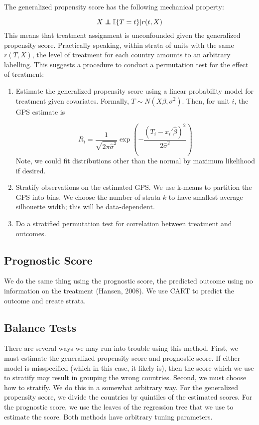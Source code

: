 \documentclass[11pt]{article}\usepackage[]{graphicx}\usepackage[]{color}
\newcommand{\ind}{\mathbb{I}} %
\newcommand{\normal}{N} %
\newcommand\independent{\protect\mathpalette{\protect\independenT}{\perp}}
\def\independenT#1#2{\mathrel{\rlap{$#1#2$}\mkern2mu{#1#2}}}
\begin{document}
The generalized propensity score has the following mechanical property:

$$X \independent \ind\{T = t\} \vert r(t, X)$$
This means that treatment assignment is unconfounded given the generalized propensity score.
Practically speaking, within strata of units with the same $r(T, X)$, the level of treatment for each country amounts to an arbitrary labelling.
This suggests a procedure to conduct a permutation test for the effect of treatment:
\begin{enumerate}
\item Estimate the generalized propensity score using a linear probability model for treatment given covariates.
Formally, $T \sim \normal(X\beta, \sigma^2)$.
Then, for unit $i$, the GPS estimate is

$$ R_i = \frac{1}{\sqrt{2\pi\hat{\sigma}^2}}\exp\left(-\frac{(T_i - x_i'\hat{\beta})^2}{2\hat{\sigma}^2}\right)$$
Note, we could fit distributions other than the normal by maximum likelihood if desired. 
\item Stratify observations on the estimated GPS. 
We use k-means to partition the GPS into bins. 
We choose the number of strata $k$ to have smallest average silhouette width; this will be data-dependent.
\item Do a stratified permutation test for correlation between treatment and outcomes.
\end{enumerate}


\subsection{Prognostic Score}
We do the same thing using the prognostic score, the predicted outcome using no information on the treatment (Hansen, 2008).
We use CART to predict the outcome and create strata.

\subsection{Balance Tests}
There are several ways we may run into trouble using this method.
First, we must estimate the generalized propensity score and prognostic score.
If either model is misspecified (which in this case, it likely is), then the score which we use to stratify may result in grouping the wrong countries.
Second, we must choose how to stratify.
We do this in a somewhat arbitrary way.
For the generalized propensity score, we divide the countries by quintiles of the estimated scores.
For the prognostic score, we use the leaves of the regression tree that we use to estimate the score.
Both methods have arbitrary tuning parameters.
\end{document}
